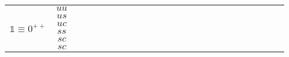 \documentclass[10pt]{article}
\newcommand{\loq}{{\color[HTML]{006600}{ll}}}
\newcommand{\lon}{{\color[HTML]{800080}{ll}}}
\newcommand{\smn}{{\color[HTML]{800080}{ss}}}
\newcommand{\rcell}{\cellcolor[HTML]{F7CB4A}}
\newcommand{\ocell}{\cellcolor[HTML]{FBAFB5}}
\newcommand{\gcell}{\cellcolor[HTML]{92D2D6}}
\begin{document}
\begin{table}[t]
\begin{adjustbox}{max width=\textwidth}
\begin{tabular}{@{}cc|cc|cc|cc|cc|cc|cc|cc|cc|cc|cc|cc@{}}
        \multirow{6}{*}{$\mathds{1} \equiv 0^{++}$} 
        & $uu$ 
        & \rcell\loq&\rcell\smn %
        & \rcell\loq&\gcell\smn %
        & \ocell\loq&\gcell\smn %
        & \gcell\loq&\gcell\smn %
        & \ocell\loq&\gcell\smn %
        & \ocell\loq&\ocell\smn %
        & \ocell\lon&\gcell\smn %
        & \ocell\lon&\gcell\smn %
        & \rcell\lon&\gcell\smn %
        & \rcell\lon&\ocell\smn %
        & \rcell\lon&\ocell\smn %
        \\
        & $us$ 
        & \ocell\loq&\ocell\smn %
        & \ocell\loq&\ocell\smn %
        & \ocell\loq&\ocell\smn %
        & \gcell\lon&\gcell\smn %
        & \gcell\lon&\gcell\smn %
        & \ocell\loq&\gcell\smn %
        & \ocell\lon&\gcell\smn %
        & \ocell\lon&\gcell\smn %
        & \ocell\lon&\gcell\smn %
        & \rcell\lon&\ocell\smn %
        & \rcell\lon&\ocell\smn %
        \\
        & $uc$ 
        & \ocell\loq&\ocell\smn %
        & \ocell\loq&\gcell\smn %
        & \gcell\lon&\gcell\smn %
        & \gcell\lon&\gcell\smn %
        & \gcell\lon&\gcell\smn %
        & \ocell\loq&\gcell\smn %
        & \ocell\lon&\gcell\smn %
        & \ocell\lon&\gcell\smn %
        & \rcell\lon&\gcell\smn %
        & \rcell\lon&\ocell\smn %
        & \rcell\lon&\ocell\smn %
        \\
        & $ss$ 
        & \ocell\loq&\ocell\smn %
        & \ocell\loq&\ocell\smn %
        & \gcell\loq&\gcell\smn %
        & \gcell\lon&\gcell\smn %
        & \gcell\lon&\gcell\smn %
        & \ocell\loq&\gcell\smn %
        & \ocell\lon&\gcell\smn %
        & \ocell\lon&\gcell\smn %
        & \ocell\lon&\gcell\smn %
        & \rcell\lon&\ocell\smn %
        & \rcell\lon&\ocell\smn %
        \\
        & $sc$ 
        & \ocell\loq&\ocell\smn %
        & \ocell\lon&\gcell\smn %
        & \gcell\loq&\gcell\smn %
        & \ocell\lon&\ocell\smn %
        & \ocell\lon&\ocell\smn %
        & \rcell\loq&\ocell\smn %
        & \rcell\lon&\ocell\smn %
        & \rcell\lon&\ocell\smn %
        & \rcell\lon&\ocell\smn %
        & \rcell\lon&\rcell\smn %
        & \rcell\lon&\rcell\smn %
        \\
        & $sc$ 
        & \ocell\loq&\ocell\smn %
        & \gcell\lon&\ocell\smn %
        & \ocell\lon&\rcell\smn %
        & \ocell\lon&\rcell\smn %
        & \ocell\lon&\rcell\smn %
        & \rcell\loq&\rcell\smn %
        & \rcell\lon&\rcell\smn %
        & \rcell\lon&\rcell\smn %
        & \rcell\lon&\rcell\smn %
        & \rcell\lon&\rcell\smn %
        & \rcell\lon&\rcell\smn %
        \\
        \bottomrule

    \end{tabular}
    \end{adjustbox}
\end{table}
\end{document}
